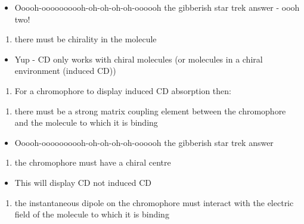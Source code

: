 \documentclass[
]{book}
\providecommand{\tightlist}{%
  \setlength{\itemsep}{0pt}\setlength{\parskip}{0pt}}
\begin{document}
\begin{itemize}
\tightlist
\item
  Ooooh-oooooooooh-oh-oh-oh-oh-oooooh the gibberish star trek answer - oooh two!
\end{itemize}

\begin{enumerate}
\def\labelenumi{\alph{enumi}.}
\setcounter{enumi}{5}
\tightlist
\item
  there must be chirality in the molecule
\end{enumerate}

\begin{itemize}
\tightlist
\item
  Yup - CD only works with chiral molecules (or molecules in a chiral environment (induced CD))
\end{itemize}

\begin{enumerate}
\def\labelenumi{\arabic{enumi}.}
\setcounter{enumi}{2}
\tightlist
\item
  For a chromophore to display induced CD absorption then:
\end{enumerate}

\begin{enumerate}
\def\labelenumi{\alph{enumi}.}
\tightlist
\item
  there must be a strong matrix coupling element between the chromophore and the molecule to which it is binding
\end{enumerate}

\begin{itemize}
\tightlist
\item
  Ooooh-oooooooooh-oh-oh-oh-oh-oooooh the gibberish star trek answer
\end{itemize}

\begin{enumerate}
\def\labelenumi{\alph{enumi}.}
\setcounter{enumi}{1}
\tightlist
\item
  the chromophore must have a chiral centre
\end{enumerate}

\begin{itemize}
\tightlist
\item
  This will display CD not induced CD
\end{itemize}

\begin{enumerate}
\def\labelenumi{\alph{enumi}.}
\setcounter{enumi}{2}
\tightlist
\item
  the instantaneous dipole on the chromophore must interact with the electric field of the molecule to which it is binding
\end{enumerate}
\end{document}
